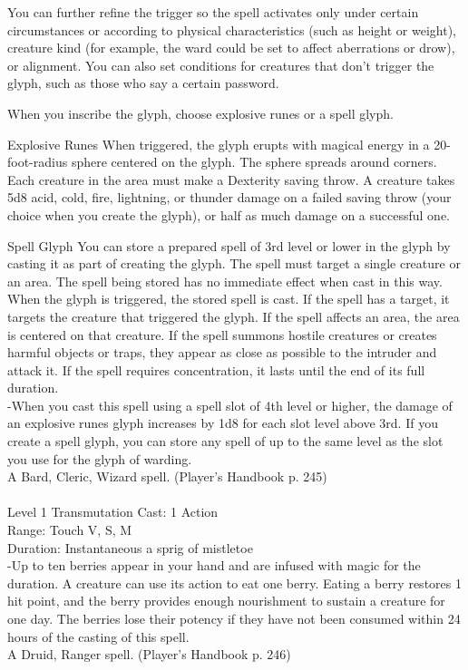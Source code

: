\documentclass[10pt,twocolumn]{report}
\begin{document}
You can further refine the trigger so the spell activates only under certain circumstances or according to physical characteristics (such as height or weight), creature kind (for example, the ward could be set to affect aberrations or drow), or alignment. You can also set conditions for creatures that don’t trigger the glyph, such as those who say a certain password.

When you inscribe the glyph, choose explosive runes or a spell glyph.

Explosive Runes
When triggered, the glyph erupts with magical energy in a 20-foot-radius sphere centered on the glyph. The sphere spreads around corners. Each creature in the area must make a Dexterity saving throw. A creature takes 5d8 acid, cold, fire, lightning, or thunder damage on a failed saving throw (your choice when you create the glyph), or half as much damage on a successful one.

Spell Glyph
You can store a prepared spell of 3rd level or lower in the glyph by casting it as part of creating the glyph. The spell must target a single creature or an area. The spell being stored has no immediate effect when cast in this way. When the glyph is triggered, the stored spell is cast. If the spell has a target, it targets the creature that triggered the glyph. If the spell affects an area, the area is centered on that creature. If the spell summons hostile creatures or creates harmful objects or traps, they appear as close as possible to the intruder and attack it. If the spell requires concentration, it lasts until the end of its full duration.\\
-When you cast this spell using a spell slot of 4th level or higher, the damage of an explosive runes glyph increases by 1d8 for each slot level above 3rd. If you create a spell glyph, you can store any spell of up to the same level as the slot you use for the glyph of warding.\\
A Bard, Cleric, Wizard spell. (Player's Handbook p. 245) \\


 \\
Level 1 \quad Transmutation \quad Cast: 1 Action\\
Range: Touch \quad V, S, M\\
Duration: Instantaneous \quad a sprig of mistletoe\\
-Up to ten berries appear in your hand and are infused with magic for the duration. A creature can use its action to eat one berry. Eating a berry restores 1 hit point, and the berry provides enough nourishment to sustain a creature for one day.
The berries lose their potency if they have not been consumed within 24 hours of the casting of this spell.\\
A Druid, Ranger spell. (Player's Handbook p. 246) \\
\end{document}
